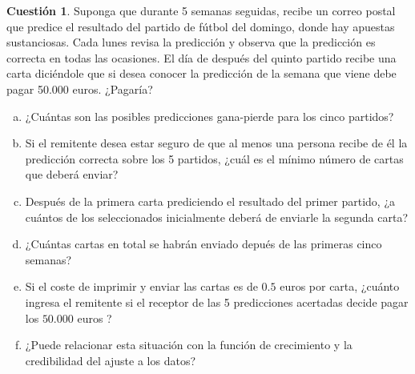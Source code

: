 \documentclass[10pt,a4paper]{article}
\theoremstyle{definition}
\newtheorem{cuestion}{Cuestión}
\begin{document}
\begin{cuestion}
Suponga que durante 5 semanas seguidas, recibe un correo postal que predice el resultado del partido de fútbol del domingo, donde hay apuestas sustanciosas. Cada lunes revisa la predicción y observa que la predicción es correcta en todas las ocasiones. El día de después del quinto partido recibe una carta diciéndole que si desea conocer la predicción de la semana que viene debe pagar 50.000 euros. ¿Pagaría?
\begin{enumerate}[a)]
\item ¿Cuántas son las posibles predicciones gana-pierde para los cinco partidos?
\item Si el remitente desea estar seguro de que al menos una persona recibe de él la predicción correcta sobre los 5 partidos, ¿cuál es el mínimo número de cartas que deberá enviar?
\item Después de la primera carta prediciendo el resultado del primer partido, ¿a cuántos de los seleccionados inicialmente deberá de enviarle la segunda carta?
\item ¿Cuántas cartas en total se habrán enviado depués de las primeras cinco semanas?
\item  Si el coste de imprimir y enviar las cartas es de $0.5$ euros por carta, ¿cuánto ingresa el remitente si el receptor de las 5 predicciones acertadas decide pagar los $50.000$ euros ?
\item ¿Puede relacionar esta situación con la función de crecimiento y la credibilidad del ajuste a los datos?
\end{enumerate}
\end{cuestion}
\end{document}
